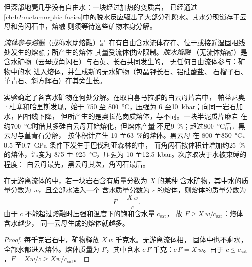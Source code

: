 但深部地壳几乎没有自由水：一块经过加热的变质岩，
已经通过
\cref{ch:b2:metamorphic-facies}中的脱水反应驱出了大部分孔隙水。其水分现锁存于云母和角闪石中，熔融
则须等待这些矿物本身分解。

\begin{definition}[流体参与熔融与脱水熔融]\label{def:b2:crustal-melting:reactions}
\emph{流体参与熔融}（或称水助熔融）是
在有自由含水流体存在、位于或接近湿固相线处发生的熔融；所产生的熔体
其量受流体供应限制。\emph{脱水熔融}
（无流体熔融）是含水矿物（云母或角闪石）与石英、长石共同发生的，
无任何自由流体参与：矿物中的水
进入熔体，并生成新的无水矿物（包晶钾长石、铝硅酸盐、
石榴子石、堇青石、斜方辉石）在其旁生长。
\end{definition}

实验确定了各含水矿物在何处分解。在取自喜马拉雅的白云母片岩中，
帕蒂尼奥·杜塞和哈里斯发现，始于 750 至
\qty{800}{\celsius}，压强为 6 至\qty{10}{kbar}；向同一岩石加水，固相线下降，
但所产生的是奥长花岗质熔体，与不同。一块半泥质片麻岩
在约\qty{700}{\celsius}时借其多硅白云母开始熔化，但熔体产量
不足\qty{9}{\percent}；超过\qty{800}{\celsius}后，黑云母与堇青石分解，
按体积计产生 10 至\qty{63}{\percent}的熔体。黑云母
在 800 至\qty{850}{\celsius}、0.5 至\qty{0.7}{GPa} 条件下发生于巴伐利亚森林的中，
而角闪石按体积计增加约\qty{25}{\percent}的熔体，温度为 875 至
\qty{925}{\celsius}，压强为 10 至\qty{12.5}{kbar}。次序取决于水被束缚的程度：
白云母最先，黑云母其次，角闪石最后。

\begin{proposition}[受水量限制的熔体分数]\label{prop:b2:crustal-melting:water}
在无游离流体的中，若一块岩石含有质量分数为 $X$ 的某种
含水矿物，其中水的质量分数为 $w$，且全部水进入一个
含水质量分数为 $c$ 的熔体，则熔体的质量分数为
\[F = \frac{X\,w}{c}.\]
由于 $c$ 不能超过熔融时压强和温度下的饱和含水量 $c_{\mathrm{sat}}$，
故 $F \ge X\,w/c_{\mathrm{sat}}$：熔体含水越少，
同一云母生成的熔体就越多。
\end{proposition}

\begin{proof}
每千克岩石中，矿物释放 $X\,w$ 千克水。无游离流体相，
固体中也不剩水，全部水都进入熔体。熔体质量为 $F$，其中含水 $c\,F$
千克：$c\,F = X\,w$。由于 $c \le c_{\mathrm{sat}}$，$F = Xw/c \ge
Xw/c_{\mathrm{sat}}$。
\end{proof}

